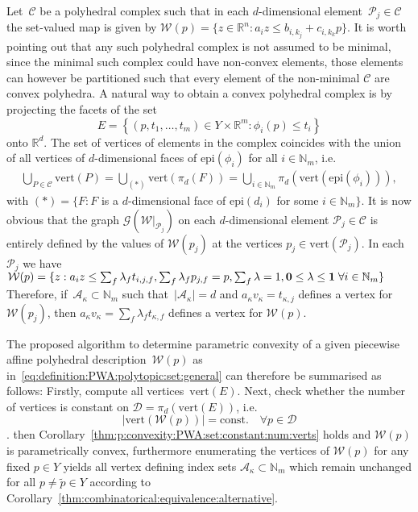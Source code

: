 \documentclass[a4paper, 12pt, twoside]{article}
\theoremstyle{definition}
\numberwithin{equation}{section}
\providecommand{\abs}[1]{\left|#1\right|}
\providecommand{\epi}{\text{epi}}
\begin{document}
Let~$\mathcal C$ be a polyhedral complex such that in each $d$-dimensional element~$\mathcal P_j\in\mathcal C$ the set-valued map is given by $\mathcal W(p) = \{z\in\mathbb R^n:a_i z\leq b_{i,k_j} + c_{i,k_k} p\}$. 
%
It is worth pointing out that any such polyhedral complex is not assumed to be minimal, since the minimal such complex could have non-convex elements, those elements can however be partitioned such that every element of the non-minimal $\mathcal C$ are convex polyhedra. 
%
A natural way to obtain a convex polyhedral complex is by projecting the facets of the set
%
\begin{equation}
  E=\left\{(p,t_1,\dots,t_m)\in Y\times\mathbb R^{m}:\phi_i(p)\leq t_i\right\}
\end{equation}
%
onto $\mathbb R^d$.
%
The set of vertices of elements in the complex coincides with the union of all vertices of $d$-dimensional faces of $\epi(\phi_i)$ for all $i\in\mathbb N_m$, i.e.
%
$$\begin{aligned}
	\bigcup_{P\in\mathcal C}\text{vert}(P) = \bigcup_{(\ast)} \text{vert}(\pi_d(F)) = \bigcup_{i\in\mathbb N_m}\pi_d(\text{vert}(\epi(\phi_i))),
\end{aligned}$$
%
with $(\ast) = \{F: F $ is a $d$-dimensional face of $\epi(d_i)$ for some $i\in\mathbb N_m\}$.
%
It is now obvious that the graph $\mathscr G(\mathcal W\vert_{\mathcal P_j})$ on each $d$-dimensional element $\mathcal P_j\in\mathcal C$ is entirely defined by the values of $\mathcal W(p_j)$ at the vertices $p_j\in\text{vert}(\mathcal P_j)$.
%
In each~$\mathcal P_j$ we have $\mathcal W(p) = \{z: a_i z\leq \sum_f \lambda_f t_{i,j,f}, \sum_f\lambda_f p_{j,f}=p, \sum_f\lambda=1,{\bf{0}}\leq\lambda\leq{\bf{1}}\; \forall i\in\mathbb N_m\}$
%
Therefore, if~$\mathcal A_\kappa\subset\mathbb N_m$ such that~$\abs{\mathcal A_\kappa}=d$ and $a_\kappa v_\kappa = t_{\kappa,j}$ defines a vertex for $\mathcal W(p_j)$, then $a_\kappa v_\kappa = \sum_f \lambda_f t_{\kappa,f}$ defines a vertex for $\mathcal W(p)$.

The proposed algorithm to determine parametric convexity of a given piecewise affine polyhedral description~$\mathcal W(p)$ as in~\eqref{eq:definition:PWA:polytopic:set:general} can therefore be summarised as follows:
%
Firstly, compute all vertices~$\text{vert}(E)$.
%
Next, check whether the number of vertices is constant on $\mathcal D = \pi_d\left(\text{vert}(E)\right)$, i.e. 
%
$$\abs{\text{vert}(\mathcal W(p))} = \text{const.}\quad \forall p\in\mathcal D$$.
%
then Corollary~\ref{thm:p:convexity:PWA:set:constant:num:verts} holds and $\mathcal W(p)$ is parametrically convex, furthermore enumerating the vertices of $\mathcal W(p)$ for any fixed $p\in Y$ yields all vertex defining index sets $\mathcal A_\kappa\subset\mathbb N_m$ which remain unchanged for all $p\neq\tilde p\in Y$ according to Corollary~\ref{thm:combinatorical:equivalence:alternative}.
%
\end{document}
